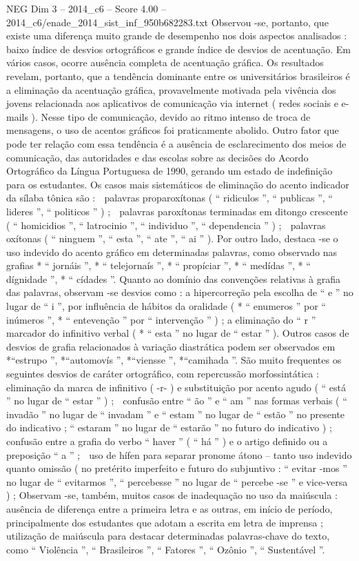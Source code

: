\begin{textsample}{NEG Dim 3 – 2014\_c6 – Score 4.00 – 2014\_c6/enade\_2014\_sist\_inf\_950b682283.txt}
Observou -se, portanto, que existe uma diferença muito grande de desempenho nos dois aspectos analisados : baixo índice de desvios ortográficos e grande índice de desvios de acentuação.
Em vários casos, ocorre ausência completa de acentuação gráfica.
Os resultados revelam, portanto, que a tendência dominante entre os universitários brasileiros é a eliminação da acentuação gráfica, provavelmente motivada pela vivência dos jovens relacionada aos aplicativos de comunicação via internet ( redes sociais e e-mails ).
Nesse tipo de comunicação, devido ao ritmo intenso de troca de mensagens, o uso de acentos gráficos foi praticamente abolido.
Outro fator que pode ter relação com essa tendência é a ausência de esclarecimento dos meios de comunicação, das autoridades e das escolas sobre as decisões do Acordo Ortográfico da Língua Portuguesa de 1990, gerando um estado de indefinição para os estudantes.
Os casos mais sistemáticos de eliminação do acento indicador da sílaba tônica são :  palavras proparoxítonas ( “ ridiculos ”, “ publicas ”, “ lideres ”, “ politicos ” ) ;  palavras paroxítonas terminadas em ditongo crescente ( “ homicidios ”, “ latrocinio ”, “ individuo ”, “ dependencia ” ) ;  palavras oxítonas ( “ ninguem ”, “ esta ”, “ ate ”, “ ai ” ).
Por outro lado, destaca -se o uso indevido do acento gráfico em determinadas palavras, como observado nas grafias * “ jornáis ”, * “ telejornaís ”, * “ propíciar ”, * “ medídas ”, * “ dígnidade ”, * “ cídades ”.
Quanto ao domínio das convenções relativas à grafia das palavras, observam -se desvios como : a hipercorreção pela escolha de “ e ” no lugar de “ i ”, por influência de hábitos da oralidade ( * “ enumeros ” por “ inúmeros ”, * “ entevenção ” por “ intervenção ” ) ; a eliminação do “ r ” marcador do infinitivo verbal ( * “ esta ” no lugar de “ estar ” ).
Outros casos de desvios de grafia relacionados à variação diastrática podem ser observados em *“estrupo ”, *“automovís ”, *“viensse ”, *“camihada ”.
São muito frequentes os seguintes desvios de caráter ortográfico, com repercussão morfossintática :  eliminação da marca de infinitivo ( -r- ) e substituição por acento agudo ( “ está ” no lugar de “ estar ” ) ;  confusão entre “ ão ” e “ am ” nas formas verbais ( “ invadão ” no lugar de “ invadam ” e “ estam ” no lugar de “ estão ” no presente do indicativo ; “ estaram ” no lugar de “ estarão ” no futuro do indicativo ) ;  confusão entre a grafia do verbo “ haver ” ( “ há ” ) e o artigo definido ou a preposição “ a ” ;  uso de hífen para separar pronome átono – tanto uso indevido quanto omissão ( no pretérito imperfeito e futuro do subjuntivo : “ evitar -mos ” no lugar de “ evitarmos ”, “ percebesse ” no lugar de “ percebe -se ” e vice-versa ) ; Observam -se, também, muitos casos de inadequação no uso da maiúscula : ausência de diferença entre a primeira letra e as outras, em início de período, principalmente dos estudantes que adotam a escrita em letra de imprensa ; utilização de maiúscula para destacar determinadas palavras-chave do texto, como “ Violência ”, “ Brasileiros ”, “ Fatores ”, “ Ozônio ”, “ Sustentável ”.

\end{textsample}
